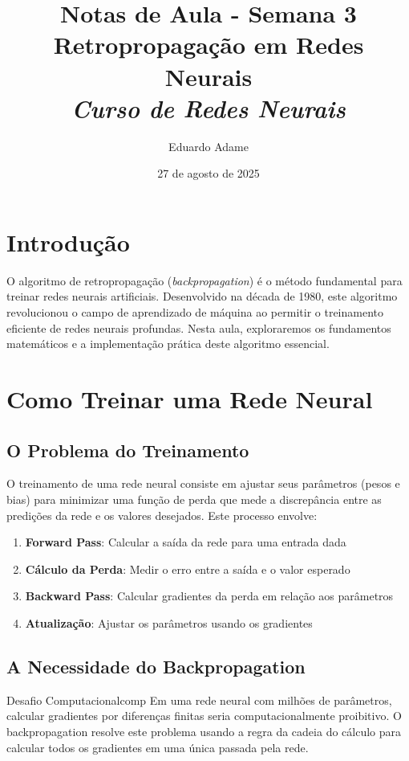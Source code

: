 \documentclass[a4paper,12pt]{article}
\title{Notas de Aula - Semana 3 \\
       \large Retropropagação em Redes Neurais\\
       \itshape Curso de Redes Neurais}
\author{Eduardo Adame}
\date{27 de agosto de 2025}
\begin{document}
\maketitle
\tableofcontents
\newpage

\section{Introdução}

O algoritmo de retropropagação (\textit{backpropagation}) é o método fundamental para treinar redes neurais artificiais. Desenvolvido na década de 1980, este algoritmo revolucionou o campo de aprendizado de máquina ao permitir o treinamento eficiente de redes neurais profundas. Nesta aula, exploraremos os fundamentos matemáticos e a implementação prática deste algoritmo essencial.

\section{Como Treinar uma Rede Neural}

\subsection{O Problema do Treinamento}

O treinamento de uma rede neural consiste em ajustar seus parâmetros (pesos e bias) para minimizar uma função de perda que mede a discrepância entre as predições da rede e os valores desejados. Este processo envolve:

\begin{enumerate}
    \item \textbf{Forward Pass}: Calcular a saída da rede para uma entrada dada
    \item \textbf{Cálculo da Perda}: Medir o erro entre a saída e o valor esperado
    \item \textbf{Backward Pass}: Calcular gradientes da perda em relação aos parâmetros
    \item \textbf{Atualização}: Ajustar os parâmetros usando os gradientes
\end{enumerate}

\subsection{A Necessidade do Backpropagation}

\begin{observacao}{Desafio Computacional}{comp}
Em uma rede neural com milhões de parâmetros, calcular gradientes por diferenças finitas seria computacionalmente proibitivo. O backpropagation resolve este problema usando a regra da cadeia do cálculo para calcular todos os gradientes em uma única passada pela rede.
\end{observacao}
\end{document}
